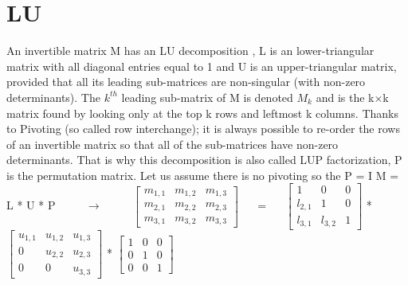 \documentclass[]{finalproject}
\begin{document}
\section{LU} \label{lu}
\begin{flushleft}
An invertible matrix M has an LU decomposition , L is an lower-triangular matrix with all diagonal entries equal to 1 and U is an upper-triangular matrix,  provided that all its leading sub-matrices are non-singular (with non-zero determinants). \linebreak
The $k^{th}$ leading sub-matrix of M is denoted $M_{k}$ and is the k×k matrix found by looking only at the top k rows and leftmost k columns. \linebreak
Thanks to Pivoting (so called row interchange); it is always possible to re-order the rows of an invertible matrix so that all of the sub-matrices have non-zero determinants. That is why this decomposition is also called LUP factorization, P is the permutation matrix. \cite{lu}
\linebreak 
Let us assume there is no pivoting so the P = I \linebreak \linebreak
M = L * U * P $\qquad$ $\longrightarrow$ $\qquad$
$\begin{bmatrix} 
m_{1,1} & m_{1,2} & m_{1,3}\\
m_{2,1} & m_{2,2} & m_{2,3}\\
m_{3,1} & m_{3,2} & m_{3,3}
\end{bmatrix}$
$\quad$ = $\quad$
$\begin{bmatrix}
1 & 0 & 0\\
l_{2,1} & 1 & 0\\
l_{3,1} & l_{3,2} & 1
\end{bmatrix}$ *
$\begin{bmatrix}
u_{1,1} & u_{1,2} & u_{1,3}\\
0 & u_{2,2} & u_{2,3}\\
0 & 0 & u_{3,3}
\end{bmatrix}$
*
$\begin{bmatrix}
1 & 0 & 0\\
0 & 1 & 0\\
0 & 0 & 1
\end{bmatrix}$


\end{flushleft}
\end{document}

